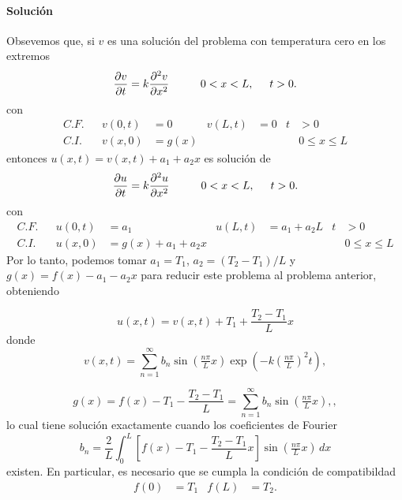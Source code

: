 \documentclass[11pt,letterpaper,draft]{report}
\theoremstyle{plain}
\theoremstyle{definition}
\theoremstyle{remark}
\newcommand\<{\langle}
\renewcommand\>{\rangle}
\begin{document}
\paragraph{Solución}
Obsevemos que, si $v$ es una solución del problema con
temperatura cero en los extremos
\[
  \frac{\partial v}{\partial t}
  = k
  \frac{\partial ^2 v}{\partial x^2}
  \hspace{10mm} 0<x<L,
  \hspace{5mm} t>0.
\]
con
\begin{align*}
  C.F. && v(0,t) &= 0 & v(L,t) &= 0 &t&>0 \\
  C.I. && v(x,0) &= g(x) & &&& 0\leq x\leq L
\end{align*}
entonces $u(x,t)=v(x,t)+a_1+a_2x$ es solución de
\[
  \frac{\partial u}{\partial t}
  = k
  \frac{\partial ^2 u}{\partial x^2}
  \hspace{10mm} 0<x<L,
  \hspace{5mm} t>0.
\]
con
\begin{align*}
  C.F. && u(0,t) &= a_1 & u(L,t) &= a_1+a_2L &t&>0 \\
  C.I. && u(x,0) &= g(x)+a_1+a_2x & &&& 0\leq x\leq L
\end{align*}
Por lo tanto, podemos tomar $a_1=T_1$, $a_2=(T_2-T_1)/L$ y
$g(x)=f(x)-a_1-a_2x$ para reducir este problema al problema
anterior, obteniendo

\[
  u(x,t) = v(x,t) + T_1 + \frac{T_2-T_1}{L}x
\]
donde
\begin{equation}
  v(x,t)
  = \sum_{n=1}^{\infty}
  b_n\sin(\tfrac{n\pi}{L}x)\exp(-k(\tfrac{n\pi}{L})^2t),
\end{equation}

\[
  g(x)
  = f(x)-T_1-\frac{T_2-T_1}{L}
  = \sum_{n=1}^{\infty}
  b_n\sin(\tfrac{n\pi}{L}x),
,\]
lo cual tiene solución exactamente cuando los coeficientes de
Fourier
\[
  b_n = \frac{2}{L}\int_0^L
    \left[f(x) - T_1 - \frac{T_2-T_1}{L}x\right]
    \sin(\tfrac{n\pi}{L}x)\,dx
\]
existen. En particular, es necesario que se cumpla
la condición de compatibildad
\begin{align*}
  f(0) &= T_1 & f(L) &= T_2.
\end{align*}
\end{document}
